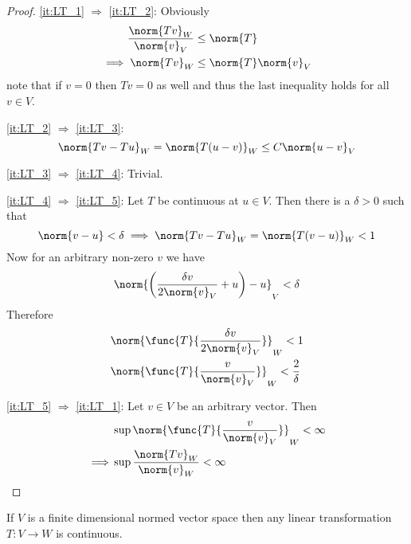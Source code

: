 \begin{proof}
    \cref{it:LT_1} \(\Rightarrow\) \cref{it:LT_2}: Obviously
    \begin{align*}
        \dfrac{\norm{Tv}_W}{\norm{v}_V} & \leq \norm{T}            \\
        \implies \norm{Tv}_W            & \leq \norm{T} \norm{v}_V
    \end{align*}
    note that if \(v = 0\) then \(Tv = 0\) as well and thus the last inequality holds for all \(v \in V\).

    \cref{it:LT_2} \(\Rightarrow\) \cref{it:LT_3}:
    \begin{equation*}
        \norm{Tv - Tu}_W = \norm{T(u - v)}_W \leq C \norm{u - v}_V
    \end{equation*}

    \cref{it:LT_3} \(\Rightarrow\) \cref{it:LT_4}: Trivial.

    \cref{it:LT_4} \(\Rightarrow\) \cref{it:LT_5}: Let \(T\) be continuous at \(u \in V\). Then there is  a \(\delta > 0 \) such that
    \begin{equation*}
        \norm{v-u} < \delta \implies \norm{Tv - Tu}_W = \norm{T(v-u)}_W < 1
    \end{equation*}
    Now for an arbitrary non-zero \(v\) we have
    \begin{equation*}
        \norm{\left( \dfrac{\delta v}{2\norm{v}_V} + u \right) - u}_V < \delta
    \end{equation*}
    Therefore
    \begin{align*}
         & \norm{\func{T}{\dfrac{\delta v}{2\norm{v}_V}}}_W  < 1         \\
         & \norm{\func{T}{\dfrac{v}{\norm{v}_V}}}_W  < \dfrac{2}{\delta}
    \end{align*}

    \cref{it:LT_5} \(\Rightarrow\) \cref{it:LT_1}: Let \(v \in V\) be an arbitrary vector. Then
    \begin{align*}
                 & \sup \norm{\func{T}{\dfrac{v}{\norm{v}_V}}}_W < \infty \\
        \implies & \sup \dfrac{\norm{Tv}_W}{\norm{v}_W} < \infty
    \end{align*}

\end{proof}




\begin{theorem} \label{th:finiteDimensionTransformationContinuous}
    If \(V\) is a finite dimensional normed vector space then any linear transformation \(T : V \to W\) is continuous.
\end{theorem}

